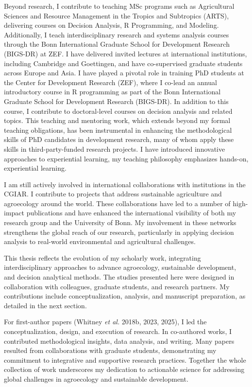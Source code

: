 \documentclass[
]{article}
\begin{document}
Beyond research, I contribute to teaching MSc programs such as
Agricultural Sciences and Resource Management in the Tropics and
Subtropics (ARTS), delivering courses on Decision Analysis, R
Programming, and Modeling. Additionally, I teach interdisciplinary
research and systems analysis courses through the Bonn International
Graduate School for Development Research (BIGS-DR) at ZEF. I have
delivered invited lectures at international institutions, including
Cambridge and Goettingen, and have co-supervised graduate students
across Europe and Asia. I have played a pivotal role in training PhD
students at the Center for Development Research (ZEF), where I co-lead
an annual introductory course in R programming as part of the Bonn
International Graduate School for Development Research (BIGS-DR). In
addition to this course, I contribute to doctoral-level courses on
decision analysis and related topics. This teaching and mentoring work,
which extends beyond my formal teaching obligations, has been
instrumental in enhancing the methodological skills of PhD candidates in
development research, many of whom apply these skills in
third-party-funded research projects. I have introduced innovative
approaches to experiential learning, my teaching philosophy emphasizes
hands-on, experiential learning.

I am still actively involved in international collaborations with
institutions in the CGIAR. I contribute to projects that address
sustainable agriculture and agroecology around the world. These
collaborations have led to a number of high-impact publications and have
enhanced the international visibility of both my research group and the
University of Bonn. My involvement in these networks strengthens the
global reach of our research, particularly in applying decision analysis
to real-world environmental and agricultural challenges.

This thesis reflects the evolution of my scholarly work, integrating
interdisciplinary approaches to advance agroecology, sustainable
development, and decision analytical methods. The studies presented here
were designed in collaboration with colleagues, graduate students, and
research partners. My contributions include conceptualization, analysis,
and manuscript preparation, as detailed in the next section.

For first-author papers (Whitney \emph{et al.} 2018b, 2023, 2025), I led
the conceptualization, design, and execution of research. In co-authored
works, I contributed methodological insights, data analysis, and
writing. Many papers resulted from collaborations with graduate
students, demonstrating my commitment to integrative and supportive
research practices. Together the whole collection of work underscores my
dedication to actionable science for addressing global challenges in
agroecology and sustainable development.
\end{document}
